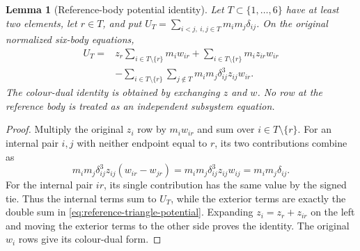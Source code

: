 \documentclass[11pt]{amsart}
\newtheorem{lemma}[theorem]{Lemma}
\theoremstyle{remark}
\begin{document}
\begin{lemma}[Reference-body potential identity]\label{lem:reported-reference-triangle}
Let $T\subset\{1,\ldots,6\}$ have at least two elements, let $r\in T$, and put $U_T=\sum_{i<j,\ i,j\in T}m_im_j\delta_{ij}$. On the original normalized six-body equations,
\begin{equation}\label{eq:reference-triangle-potential}
\begin{aligned}
 U_T={}&z_r\sum_{i\in T\setminus\{r\}}m_iw_{ir}
       +\sum_{i\in T\setminus\{r\}}m_i z_{ir}w_{ir}\\
 &-\sum_{i\in T\setminus\{r\}}\sum_{j\notin T}
       m_im_j\delta_{ij}^3z_{ij}w_{ir}.
\end{aligned}
\end{equation}
The colour-dual identity is obtained by exchanging $z$ and $w$. No row at the reference body is treated as an independent subsystem equation.
\end{lemma}
\begin{proof}
Multiply the original $z_i$ row by $m_iw_{ir}$ and sum over $i\in T\setminus\{r\}$. For an internal pair $i,j$ with neither endpoint equal to $r$, its two contributions combine as
\[
 m_im_j\delta_{ij}^3z_{ij}(w_{ir}-w_{jr})
 =m_im_j\delta_{ij}^3z_{ij}w_{ij}
 =m_im_j\delta_{ij}.
\]
For the internal pair $ir$, its single contribution has the same value by the signed tie. Thus the internal terms sum to $U_T$, while the exterior terms are exactly the double sum in \eqref{eq:reference-triangle-potential}. Expanding $z_i=z_r+z_{ir}$ on the left and moving the exterior terms to the other side proves the identity. The original $w_i$ rows give its colour-dual form.
\end{proof}
\end{document}
